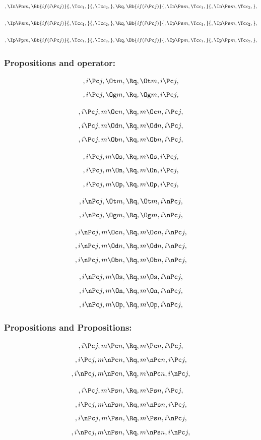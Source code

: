 \[,\In \Pn m, \Bb{if(i \Pc j)}{,\Tc c_1,}{,\Tc c_2,}, \Rq , \Bb{if(i \Pc j)}{,\In \Pn m,\Tc c_1,}{,\In \Pn m,\Tc c_2,},\]
\bigskip
\bigskip

\[,\Ip \Ps m, \Bb{if(i \Pc j)}{,\Tc c_1,}{,\Tc c_2,}, \Rq , \Bb{if(i \Pc j)}{,\Ip \Ps m,\Tc c_1,}{,\Ip \Ps m,\Tc c_2,},\]
\bigskip
\bigskip

\[,\Ip \Pp m, \Bb{if(i \Pc j)}{,\Tc c_1,}{,\Tc c_2,}, \Rq , \Bb{if(i \Pc j)}{,\Ip \Pp m,\Tc c_1,}{,\Ip \Pp m,\Tc c_2,},\]
\bigskip
\bigskip





\bigskip
\bigskip
\bigskip
\bigskip
\subsubsection{ Propositions and operator:}
\[, i \Pc j, \Ot m, \Rq , \Ot m, i \Pc j,\]
\[, i \Pc j, \Og m, \Rq , \Og m, i \Pc j,\]

\[, i \Pc j, m \Oc n, \Rq , m \Oc n, i \Pc j,\]
\[, i \Pc j, m \Od n, \Rq , m \Od n, i \Pc j,\]
\[, i \Pc j, m \Ob n, \Rq , m \Ob n, i \Pc j,\]

\[, i \Pc j, m \Os, \Rq , m \Os, i \Pc j,\]
\[, i \Pc j, m \On, \Rq , m \On, i \Pc j,\]
\[, i \Pc j, m \Op, \Rq , m \Op, i \Pc j,\]

\bigskip
\bigskip
\[, i \nPc j, \Ot m, \Rq , \Ot m, i \nPc j,\]
\[, i \nPc j, \Og m, \Rq , \Og m, i \nPc j,\]

\[, i \nPc j, m \Oc n, \Rq , m \Oc n, i \nPc j,\]
\[, i \nPc j, m \Od n, \Rq , m \Od n, i \nPc j,\]
\[, i \nPc j, m \Ob n, \Rq , m \Ob n, i \nPc j,\]

\[, i \nPc j, m \Os, \Rq , m \Os, i \nPc j,\]
\[, i \nPc j, m \On, \Rq , m \On, i \nPc j,\]
\[, i \nPc j, m \Op, \Rq , m \Op, i \nPc j,\]




\bigskip
\bigskip
\bigskip
\bigskip
\subsubsection{ Propositions and Propositions:}
\[,i \Pc j, m \Pc n, \Rq , m \Pc n, i \Pc j,\]
\[,i \Pc j, m \nPc n, \Rq , m \nPc n, i \Pc j,\]
\[,i \nPc j, m \nPc n, \Rq , m \nPc n, i \nPc j,\]

\[,i \Pc j, m \Ps n, \Rq , m \Ps n, i \Pc j,\]
\[,i \Pc j, m \nPs n, \Rq , m \nPs n, i \Pc j,\]
\[,i \nPc j, m \Ps n, \Rq , m \Ps n, i \nPc j,\]
\[,i \nPc j, m \nPs n, \Rq , m \nPs n, i \nPc j,\]


